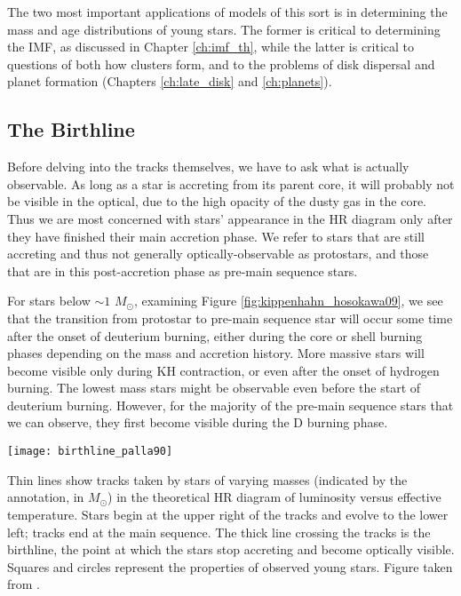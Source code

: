 The two most important applications of models of this sort is in determining the mass and age distributions of young stars. The former is critical to determining the IMF, as discussed in Chapter \ref{ch:imf_th}, while the latter is critical to questions of both how clusters form, and to the problems of disk dispersal and planet formation (Chapters \ref{ch:late_disk} and \ref{ch:planets}).

\subsection{The Birthline}

Before delving into the tracks themselves, we have to ask what is actually observable. As long as a star is accreting from its parent core, it will probably not be visible in the optical, due to the high opacity of the dusty gas in the core. Thus we are most concerned with stars' appearance in the HR diagram only after they have finished their main accretion phase. We refer to stars that are still accreting and thus not generally optically-observable as protostars, and those that are in this post-accretion phase as pre-main sequence stars. 

For stars below $\sim 1$ $M_\odot$, examining Figure \ref{fig:kippenhahn_hosokawa09}, we see that the transition from protostar to pre-main sequence star will occur some time after the onset of deuterium burning, either during the core or shell burning phases depending on the mass and accretion history. More massive stars will become visible only during KH contraction, or even after the onset of hydrogen burning. The lowest mass stars might be observable even before the start of deuterium burning. However, for the majority of the pre-main sequence stars that we can observe, they first become visible during the D burning phase.

\begin{marginfigure}
\texttt{[image: birthline\_palla90]}
\caption[The protostellar birthline]{
\label{fig:birthline_palla90}
Thin lines show tracks taken by stars of varying masses (indicated by the annotation, in $M_\odot$) in the theoretical HR diagram of luminosity versus effective temperature. Stars begin at the upper right of the tracks and evolve to the lower left; tracks end at the main sequence. The thick line crossing the tracks is the birthline, the point at which the stars stop accreting and become optically visible. Squares and circles represent the properties of observed young stars. Figure taken from \citet{palla90a}.
}
\end{marginfigure}

